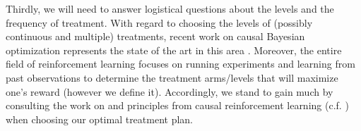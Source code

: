 Thirdly, we will need to answer logistical questions about the levels and the frequency of treatment.
With regard to choosing the levels of (possibly continuous and multiple) treatments, recent work on causal Bayesian optimization represents the state of the art in this area \citep{aglietti_2020_causal}.
Moreover, the entire field of reinforcement learning focuses on running experiments and learning from past observations to determine the treatment arms/levels that will maximize one's reward (however we define it).
Accordingly, we stand to gain much by consulting the work on and principles from causal reinforcement learning (c.f. \citet{bareinboim_2015_bandits}) when choosing our optimal treatment plan.
